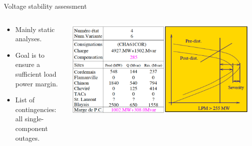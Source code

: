 \begin{frame} {Voltage stability assessment}
\begin{columns}
    \begin{column}{0.35\textwidth}
\begin{itemize}
    \item Mainly static analyses.
    \item Goal is to ensure a sufficient load power margin.
    \item List of contingencies: all single-component outages.
\end{itemize}
    \end{column}
    \begin{column}{0.65\textwidth}
        \begin{center}
        \includegraphics[width=0.9\linewidth]{images/pfonc-sev.png}
        \end{center}
    \end{column}
\end{columns}
\end{frame}

